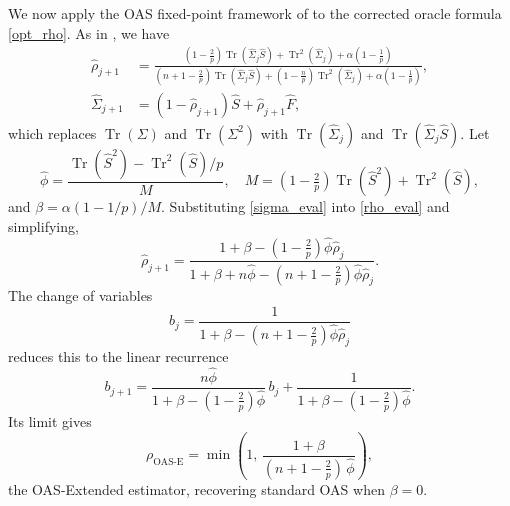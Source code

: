 \documentclass[journal]{IEEEtran}
\begin{document}
We now apply the OAS fixed-point framework of \cite{OAS} to the corrected oracle formula
\eqref{opt_rho}.
As in \cite{OAS}, we have
\begin{align}
\hat{\rho}_{j+1} &= \frac{(1-\tfrac{2}{p})\operatorname{Tr}(\hat{\Sigma}_j\hat{S})
  +\operatorname{Tr}^2(\hat{\Sigma}_j)+\alpha(1-\tfrac{1}{p})}
  {(n+1-\tfrac{2}{p})\operatorname{Tr}(\hat{\Sigma}_j\hat{S})
  +(1-\tfrac{n}{p})\operatorname{Tr}^2(\hat{\Sigma}_j)+\alpha(1-\tfrac{1}{p})},
  \label{rho_eval}\\
\hat{\Sigma}_{j+1} &= (1-\hat{\rho}_{j+1})\hat{S}+\hat{\rho}_{j+1}\hat{F}, \label{sigma_eval}
\end{align}
which replaces $\operatorname{Tr}(\Sigma)$ and $\operatorname{Tr}(\Sigma^2)$ with
$\operatorname{Tr}(\hat{\Sigma}_j)$ and $\operatorname{Tr}(\hat{\Sigma}_j\hat{S})$.
Let
\begin{equation}
\hat{\phi} = \frac{\operatorname{Tr}(\hat{S}^2)-\operatorname{Tr}^2(\hat{S})/p}{M}, \quad
M = (1-\tfrac{2}{p})\operatorname{Tr}(\hat{S}^2)+\operatorname{Tr}^2(\hat{S}),
\end{equation}
and $\beta=\alpha(1-1/p)/M$.
Substituting \eqref{sigma_eval} into \eqref{rho_eval} and simplifying,
\begin{equation}
\hat{\rho}_{j+1} = \frac{1+\beta-(1-\tfrac{2}{p})\hat{\phi}\hat{\rho}_j}
  {1+\beta+n\hat{\phi}-(n+1-\tfrac{2}{p})\hat{\phi}\hat{\rho}_j}.
\end{equation}
The change of variables
\begin{equation}
b_j = \frac{1}{1+\beta-(n+1-\tfrac{2}{p})\hat{\phi}\hat{\rho}_j}
\end{equation}
reduces this to the linear recurrence
\begin{equation}
b_{j+1} = \frac{n\hat{\phi}}{1+\beta-(1-\tfrac{2}{p})\hat{\phi}}\,b_j
  + \frac{1}{1+\beta-(1-\tfrac{2}{p})\hat{\phi}}.
\end{equation}
Its limit gives
\begin{equation}
\label{new_OAS}
\rho_{\text{OAS-E}} = \min\!\left(1,\, \frac{1+\beta}{(n+1-\tfrac{2}{p})\,\hat{\phi}}\right),
\end{equation}
the OAS-Extended estimator, recovering standard OAS when $\beta=0$.
\end{document}
